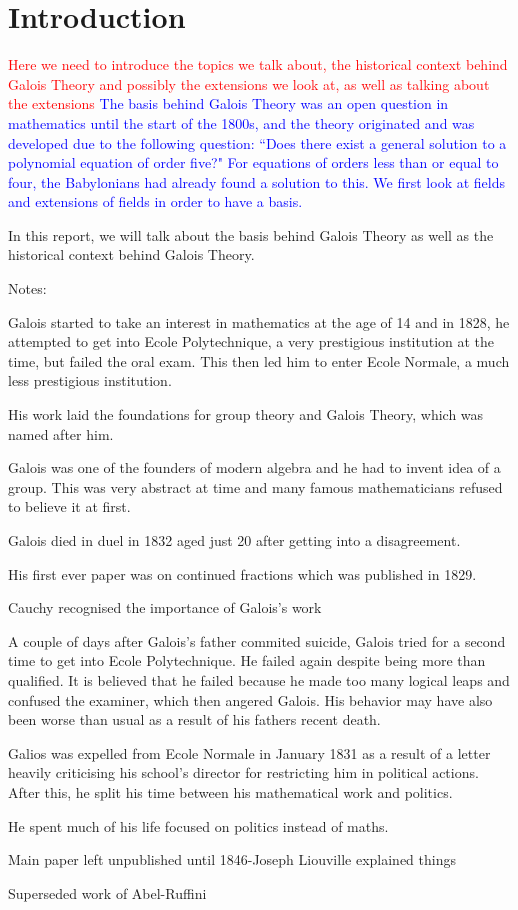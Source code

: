 \section{Introduction}
\textcolor{red}{Here we need to introduce the topics we talk about, the historical context behind Galois Theory and possibly the extensions we look at, as well as talking about the extensions}
\textcolor{blue}{The basis behind Galois Theory was an open question in mathematics until the start of the 1800s, and the theory originated and was developed due to the following question: ``Does there exist a general solution to a polynomial equation of order five?"  For equations of orders less than or equal to four, the Babylonians had already found a solution to this.
We first look at fields and extensions of fields in order to have a basis.}

In this report, we will talk about the basis behind Galois Theory as well as the historical context behind Galois Theory.




Notes:

Galois started to take an interest in mathematics at the age of 14 and in 1828, he attempted to get into Ecole Polytechnique, a very prestigious institution at the time, but failed the oral exam. This then led him to enter Ecole Normale, a much less prestigious institution.

His work laid the foundations for group theory and Galois Theory, which was named after him.

Galois was one of the founders of modern algebra and he had to invent idea of a group. This was very abstract at time and many famous mathematicians refused to believe it at first.

Galois died in duel in 1832 aged just 20 after getting into a disagreement.

His first ever paper was on continued fractions which was published in 1829. 

Cauchy recognised the importance of Galois's work

A couple of days after Galois's father commited suicide, Galois tried for a second time to get into Ecole Polytechnique. He failed again despite being more than qualified. It is believed that he failed because he made too many logical leaps and confused the examiner, which then angered Galois. His behavior may have also been worse than usual as a result of his fathers recent death.

Galios was expelled from Ecole Normale in January 1831 as a result of a letter heavily criticising his school's director for restricting him in political actions. After this, he split his time between his mathematical work and politics.

He spent much of his life focused on politics instead of maths. 

Main paper left unpublished until 1846-Joseph Liouville explained things

Superseded work of Abel-Ruffini
